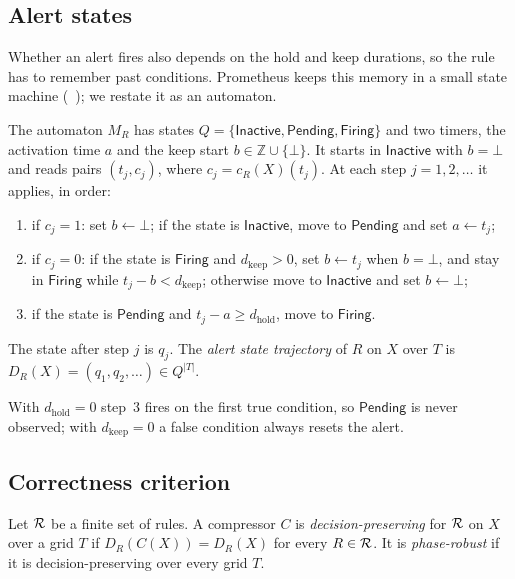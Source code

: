 \subsection{Alert states}

Whether an alert fires also depends on the hold and keep durations, so the
rule has to remember past conditions. Prometheus keeps this memory in a
small state machine (~\cite{promsrc}); we restate it as an automaton.

\begin{definition}
\label{def:automaton}
The automaton $M_R$ has states $Q = \{\mathsf{Inactive}, \mathsf{Pending},
\mathsf{Firing}\}$ and two timers, the activation time $a$ and the keep
start $b \in \mathbb{Z} \cup \{\bot\}$. It starts in $\mathsf{Inactive}$
with $b = \bot$ and reads pairs $(t_j, c_j)$, where $c_j = c_R(X)(t_j)$. At
each step $j = 1, 2, \dots$ it applies, in order:
\begin{enumerate}
  \item if $c_j = 1$: set $b \gets \bot$; if the state is $\mathsf{Inactive}$,
    move to $\mathsf{Pending}$ and set $a \gets t_j$;
  \item if $c_j = 0$: if the state is $\mathsf{Firing}$ and
    $d_{\mathrm{keep}} > 0$, set $b \gets t_j$ when $b = \bot$, and stay in
    $\mathsf{Firing}$ while $t_j - b < d_{\mathrm{keep}}$; otherwise move to
    $\mathsf{Inactive}$ and set $b \gets \bot$;
  \item if the state is $\mathsf{Pending}$ and
    $t_j - a \ge d_{\mathrm{hold}}$, move to $\mathsf{Firing}$.
\end{enumerate}
The state after step $j$ is $q_j$. The \emph{alert state trajectory} of $R$
on $X$ over $T$ is $D_R(X) = (q_1, q_2, \dots) \in Q^{|T|}$.
\end{definition}

With $d_{\mathrm{hold}} = 0$ step~3 fires on the first true condition, so
$\mathsf{Pending}$ is never observed; with $d_{\mathrm{keep}} = 0$ a false
condition always resets the alert.

\subsection{Correctness criterion}

\begin{definition}
\label{def:preservation}
Let $\mathcal{R}$ be a finite set of rules. A compressor $C$ is
\emph{decision-preserving} for $\mathcal{R}$ on $X$ over a grid $T$ if
$D_R(C(X)) = D_R(X)$ for every $R \in \mathcal{R}$. It is \emph{phase-robust} if it
is decision-preserving over every grid $T$.
\end{definition}

